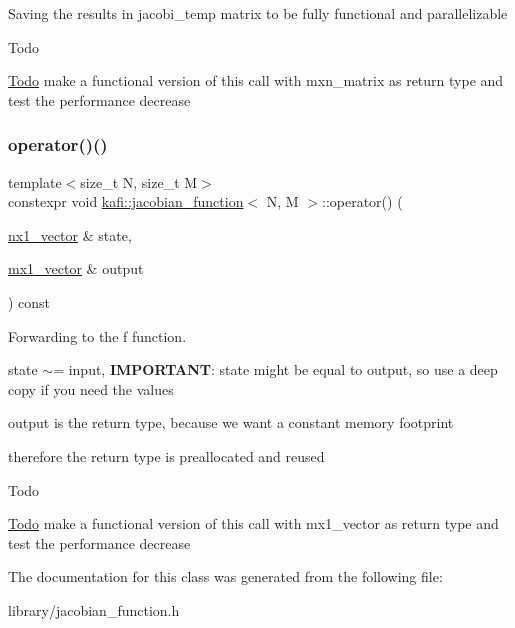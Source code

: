 Saving the results in \textquotesingle{}jacobi\+\_\+temp\textquotesingle{} matrix to be fully functional and parallelizable

\begin{DoxyRefDesc}{Todo}
\item[\hyperlink{todo__todo000002}{Todo}]make a functional version of this call with {\ttfamily mxn\+\_\+matrix} as return type and test the performance decrease \end{DoxyRefDesc}
\mbox{\label{classkafi_1_1jacobian__function_a10675231d99de2d565af965efa4010e8}} 
\subsubsection{\texorpdfstring{operator()()}{operator()()}}
{\footnotesize\ttfamily template$<$size\+\_\+t N, size\+\_\+t M$>$ \\
constexpr void \hyperlink{classkafi_1_1jacobian__function}{kafi\+::jacobian\+\_\+function}$<$ N, M $>$\+::operator() (\begin{DoxyParamCaption}\item[{\hyperlink{classkafi_1_1jacobian__function_ad7e7a8fbfa3e2785798bd46e5307ca65}{nx1\+\_\+vector} \&}]{state,  }\item[{\hyperlink{classkafi_1_1jacobian__function_ad8e32b40bc05db5ee53705a30257761d}{mx1\+\_\+vector} \&}]{output }\end{DoxyParamCaption}) const\hspace{0.3cm}{\ttfamily [inline]}}



Forwarding to the \textquotesingle{}f\textquotesingle{} function. 


\begin{DoxyItemize}
\item {\ttfamily state} $\sim$= input, {\bfseries I\+M\+P\+O\+R\+T\+A\+NT}\+: state might be equal to output, so use a deep copy if you need the values
\item {\ttfamily output} is the return type, because we want a constant memory footprint
\begin{DoxyItemize}
\item therefore the return type is preallocated and reused
\end{DoxyItemize}
\end{DoxyItemize}

\begin{DoxyRefDesc}{Todo}
\item[\hyperlink{todo__todo000001}{Todo}]make a functional version of this call with {\ttfamily mx1\+\_\+vector} as return type and test the performance decrease \end{DoxyRefDesc}


The documentation for this class was generated from the following file\+:\begin{DoxyCompactItemize}
\item 
library/jacobian\+\_\+function.\+h\end{DoxyCompactItemize}

